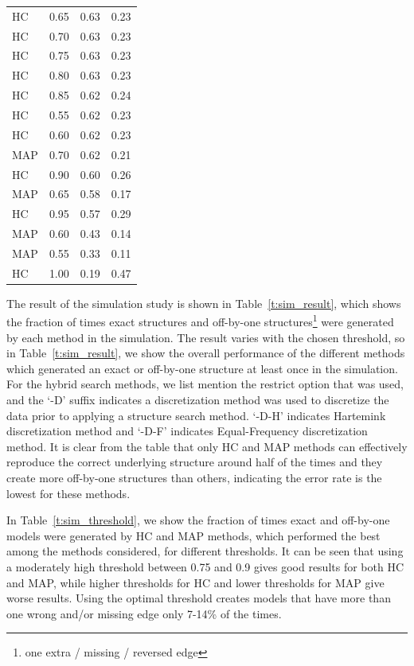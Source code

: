 \documentclass[smallcondensed]{svjour3}     %
\begin{document}
\begin{table}
{{\begin{tabular}{llll}
HC & 0.65 & 0.63 & 0.23 \\
HC & 0.70 & 0.63 & 0.23 \\
HC & 0.75 & 0.63 & 0.23 \\
HC & 0.80 & 0.63 & 0.23 \\
HC & 0.85 & 0.62 & 0.24 \\
HC & 0.55 & 0.62 & 0.23 \\
HC & 0.60 & 0.62 & 0.23 \\
MAP & 0.70 & 0.62 & 0.21 \\
HC & 0.90 & 0.60 & 0.26 \\
MAP & 0.65 & 0.58 & 0.17 \\
HC & 0.95 & 0.57 & 0.29 \\
MAP & 0.60 & 0.43 & 0.14 \\
MAP & 0.55 & 0.33 & 0.11 \\
HC & 1.00 & 0.19 & 0.47\\ \hline
\end{tabular}
}}
\vspace{-10pt}
\end{table}

The result of the simulation study is shown in Table~\ref{t:sim_result}, which shows 
the fraction of times exact structures and off-by-one structures\footnote{one extra 
/ missing / reversed edge} were generated by each method in the simulation. The result varies 
with the chosen threshold, so in Table~\ref{t:sim_result}, we show the overall performance of the
different methods  which generated an exact or off-by-one structure at least once in the simulation.
For the hybrid search methods, we list mention the restrict option that was used, and the 
`-D' suffix indicates a discretization method was used to discretize the data prior to applying 
a structure search method. `-D-H' indicates Hartemink discretization method and `-D-F' indicates 
Equal-Frequency discretization method. It is clear from the table that only HC and MAP methods
can effectively reproduce the correct underlying structure around half of the times and they create 
more off-by-one structures than others, indicating the error rate is the lowest for these methods.


In Table~\ref{t:sim_threshold}, we show the fraction of times exact and 
off-by-one models were generated by HC and MAP methods, which performed 
the best among the methods considered,  for different thresholds. 
It can be seen that using a moderately high threshold between 0.75 and 0.9 gives
good results for both HC and MAP, while higher thresholds for HC and lower thresholds for MAP
give worse results. Using the optimal threshold creates models that have more than one wrong 
and/or missing edge only 7-14\% of the times. 
\end{document}
